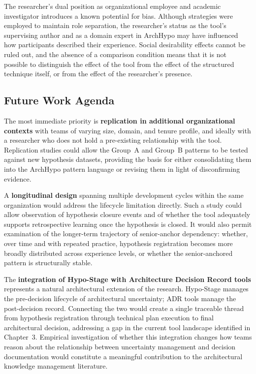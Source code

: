 The researcher's dual position as organizational employee and academic investigator
introduces a known potential for bias. Although strategies were employed to maintain
role separation, the researcher's status as
the tool's supervising author and as a domain expert in ArchHypo may have influenced
how participants described their experience. Social desirability effects cannot be ruled
out, and the absence of a comparison condition means that it is not possible to
distinguish the effect of the tool from the effect of the structured technique itself, or
from the effect of the researcher's presence.

\subsection{Future Work Agenda}

The most immediate priority is \textbf{replication in additional organizational contexts} 
with teams of varying size, domain, and tenure profile, and ideally with a researcher who does not hold a
pre-existing relationship with the tool. Replication studies could allow the Group~A and
Group~B patterns to be tested against new hypothesis datasets, providing the basis for
either consolidating them into the ArchHypo pattern language \citep{silva2024patterns}
or revising them in light of disconfirming evidence.

A \textbf{longitudinal design} spanning multiple development cycles within the same
organization would address the lifecycle limitation directly. Such a study could allow
observation of hypothesis closure events and of whether the tool adequately supports retrospective learning once the
hypothesis is closed. It would also permit examination of the longer-term trajectory of
senior-anchor dependency: whether, over time and with repeated practice, hypothesis
registration becomes more broadly distributed across experience levels, or whether the
senior-anchored pattern is structurally stable.

The \textbf{integration of Hypo-Stage with Architecture Decision Record tools} represents a natural architectural extension of the research. 
Hypo-Stage manages the pre-decision lifecycle of architectural uncertainty; ADR tools manage the
post-decision record. Connecting the two would create a single traceable thread from
hypothesis registration through technical plan execution to final architectural decision,
addressing a gap in the current tool landscape identified in Chapter~3. Empirical
investigation of whether this integration changes how teams reason about the
relationship between uncertainty management and decision documentation would
constitute a meaningful contribution to the architectural knowledge management literature.

